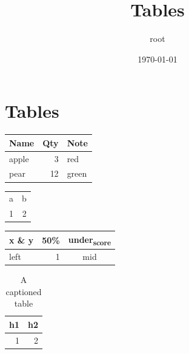 \documentclass[11pt]{article}
\author{root}
\date{\today}
\title{Tables}
\begin{document}
\maketitle
\tableofcontents

\section{Tables}
\label{sec:orgd4d6284}
\begin{center}
\begin{tabular}{lrl}
Name & Qty & Note\\[0pt]
\hline
apple & 3 & red\\[0pt]
pear & 12 & green\\[0pt]
\end{tabular}
\end{center}

\begin{center}
\begin{tabular}{rr}
a & b\\[0pt]
1 & 2\\[0pt]
\end{tabular}
\end{center}

\begin{center}
\begin{tabular}{lrc}
x \& y & 50\% & under\textsubscript{score}\\[0pt]
\hline
left & 1 & mid\\[0pt]
\end{tabular}
\end{center}

\begin{table}[htbp]
\caption{A captioned table}
\centering
\begin{tabular}{rr}
h1 & h2\\[0pt]
\hline
1 & 2\\[0pt]
\end{tabular}
\end{table}
\end{document}
